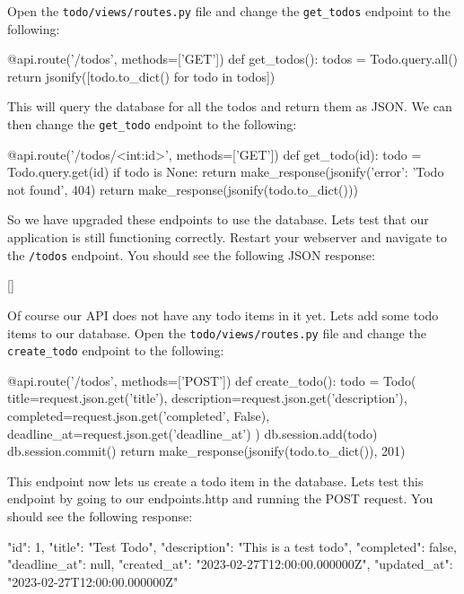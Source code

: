\documentclass{csse4400}
\begin{document}
Open the \texttt{todo/views/routes.py} file and change the \texttt{get\_todos} endpoint to the following:

\begin{code}[language=python,numbers=none]{}
  @api.route('/todos', methods=['GET'])
  def get_todos():
      todos = Todo.query.all()
      return jsonify([todo.to_dict() for todo in todos])
\end{code}

This will query the database for all the todos and return them as JSON. We can then change the \texttt{get\_todo} endpoint to the following:

\begin{code}[language=python,numbers=none]{}
  @api.route('/todos/<int:id>', methods=['GET'])
  def get_todo(id):
      todo = Todo.query.get(id)
      if todo is None:
          return make_response(jsonify({'error': 'Todo not found'}, 404)
      return make_response(jsonify(todo.to_dict()))
\end{code}

So we have upgraded these endpoints to use the database. Lets test that our application is still functioning correctly. Restart your webserver and navigate to the \texttt{/todos} endpoint. You should see the following JSON response:

\begin{code}[language=json,numbers=none]{}
  []
\end{code}

Of course our API does not have any todo items in it yet. Lets add some todo items to our database. Open the \texttt{todo/views/routes.py} file and change the \texttt{create\_todo} endpoint to the following:

\begin{code}[language=python,numbers=none]{}
  @api.route('/todos', methods=['POST'])
  def create_todo():
      todo = Todo(
          title=request.json.get('title'),
          description=request.json.get('description'),
          completed=request.json.get('completed', False),
          deadline_at=request.json.get('deadline_at')
      )
      db.session.add(todo)
      db.session.commit()
      return make_response(jsonify(todo.to_dict()), 201)
\end{code}

This endpoint now lets us create a todo item in the database. Lets test this endpoint by going to our endpoints.http and running the POST request. You should see the following response:

\begin{code}[language=json,numbers=none]{}
  {
    "id": 1,
    "title": "Test Todo",
    "description": "This is a test todo",
    "completed": false,
    "deadline_at": null,
    "created_at": "2023-02-27T12:00:00.000000Z",
    "updated_at": "2023-02-27T12:00:00.000000Z"
  }
\end{code}
\end{document}
